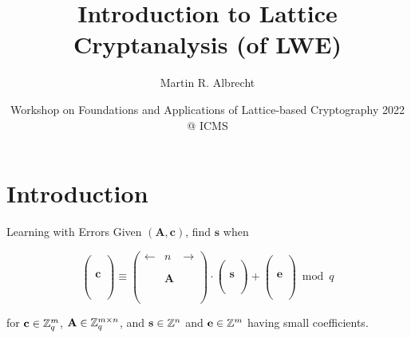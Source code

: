 \documentclass[table,10pt,aspectratio=169]{beamer}
\author{Martin R. Albrecht}
\date{Workshop on Foundations and Applications of Lattice-based Cryptography 2022 @ ICMS}
\title{Introduction to Lattice Cryptanalysis (of LWE)}
\renewcommand{\vec}[1]{\ensuremath{\mathbf{#1}}\xspace}
\providecommand{\mat}[1]{\ensuremath{\vec{#1}}\xspace}
\begin{document}
\maketitle

\section{Introduction}
\label{sec:org46fc38a}
\begin{frame}[label={sec:org09120d1}]{Learning with Errors}
Given \((\mathbf{A},\vec{c})\), find \(\vec{s}\) when

\[
\left(\begin{array}{c}
\\
\\
\\ 
\vec{c} \\
\\
\\
\\
\end{array} \right) \equiv \left(
\begin{array}{ccc}
\leftarrow & n & \rightarrow \\
\\
\\ 
& \mathbf{A} & \\
\\
\\
\\
\end{array} \right) \cdot \left( \begin{array}{c}
\\\
\\
\vec{s} \\
\\
\\
\end{array} \right) + \left(
\begin{array}{c}
\\
\\
\\ 
\vec{e} \\
\\
\\
\\
\end{array} 
\right) \bmod q
\]

for \(\vec{c} \in \ZZ_q^{m}\), \(\mat{A} \in \ZZ_q^{m \times n}\), and \(\vec{s} \in \ZZ^{n}\) and \(\vec{e} \in \ZZ^{m}\) having small coefficients.
\end{frame}
\end{document}
